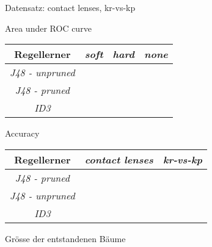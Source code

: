 
Datensatz: contact lenses, kr-vs-kp

Area under ROC curve

\begin{tabular}{c|c|c|c}
				Regellerner       & \emph{soft} & \emph{hard} & \emph{none}  \\ \hline
				\emph{J48 - unpruned} &  &  &   \\ \hline
				\emph{J48 - pruned}  &  &  &  \\ \hline
				\emph{ID3}  &  &  &  \\ \hline
\end{tabular}

Accuracy

\begin{tabular}{c|c|c}
				Regellerner       & \emph{contact lenses} & \emph{kr-vs-kp}  \\ \hline
				\emph{J48 - pruned} &   &   \\ \hline
				\emph{J48 - unpruned}  & &  \\ \hline
				\emph{ID3}  &  \\ \hline
\end{tabular}

Gr\"osse der entstandenen B\"aume
